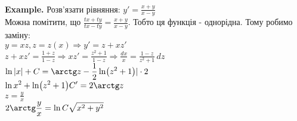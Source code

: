 \documentclass[a4paper, 14pt]{extarticle}
\def\huge{\displaystyle}
\def\bigline{\vspace{5mm}\\}
\begin{document}
	\bigline
	\textbf{Example.} Розв'язати рівняння: $\huge y' = \frac{x+y}{x-y}$\\
	Можна помітити, що $\huge \frac{tx+ty}{tx-ty} = \frac{x+y}{x-y}$. Тобто ця функція - однорідна. Тому робимо заміну:\\
	$y = xz, z=z(x) \Rightarrow y' = z + xz'$\\
	$\huge z+xz'=\frac{1+z}{1-z} \Rightarrow xz'=\frac{z^2+1}{1-z} \Rightarrow \frac{dx}{x} = \frac{1-z}{z^2+1} \,dz$\\
	$\huge \ln |x| + C = \arctg z - \frac{1}{2} \ln (z^2+1) |\cdot 2$\\
	$\huge \ln x^2 + \ln (z^2+1) C' = 2 \arctg z$\\
	$\huge z = \frac{y}{x}$\\
	$\huge 2 \arctg \frac{y}{x} = \ln C\sqrt{x^2+y^2}$
	
\end{document}
